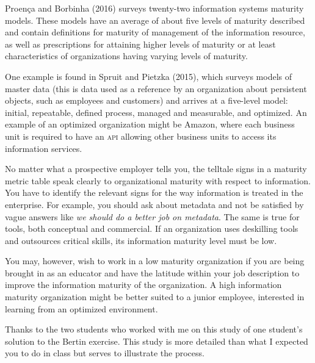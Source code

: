 Proença and Borbinha (2016) surveys twenty-two information systems
maturity models. These models have an average of about five levels of
maturity described and contain definitions for maturity of management of
the information resource, as well as prescriptions for attaining higher
levels of maturity or at least characteristics of organizations having
varying levels of maturity.

One example is found in Spruit and Pietzka (2015), which surveys models
of master data (this is data used as a reference by an organization
about persistent objects, such as employees and customers) and arrives
at a five-level model: initial, repeatable, defined process, managed and
measurable, and optimized. An example of an optimized organization might
be Amazon, where each business unit is required to have an \textsc{api}
allowing other business units to access its information services.

No matter what a prospective employer tells you, the telltale signs in a
maturity metric table speak clearly to organizational maturity with
respect to information. You have to identify the relevant signs for the
way information is treated in the enterprise. For example, you should
ask about metadata and not be satisfied by vague answers like \emph{we
should do a better job on metadata}. The same is true for tools, both
conceptual and commercial. If an organization uses deskilling tools and
outsources critical skills, its information maturity level must be low.

You may, however, wish to work in a low maturity organization if you are
being brought in as an educator and have the latitude within your job
description to improve the information maturity of the organization. A
high information maturity organization might be better suited to a
junior employee, interested in learning from an optimized environment.

\hypertarget{visual-information}{%
\label{visual-information}}

\hypertarget{visual-information-example}{%
\label{visual-information-example}}

Thanks to the two students who worked with me on this study of one
student's solution to the Bertin exercise. This study is more detailed
than what I expected you to do in class but serves to illustrate the
process.

